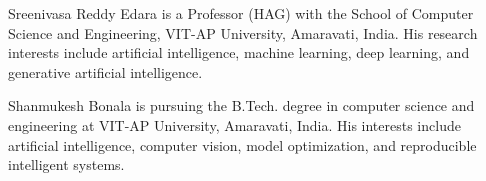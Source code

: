 \begin{IEEEbiographynophoto}{Sreenivasa Reddy Edara}
is a Professor (HAG) with the School of Computer Science and Engineering, VIT-AP University, Amaravati, India. His research interests include artificial intelligence, machine learning, deep learning, and generative artificial intelligence.
\end{IEEEbiographynophoto}
\begin{IEEEbiographynophoto}{Shanmukesh Bonala}
is pursuing the B.Tech. degree in computer science and engineering at VIT-AP University, Amaravati, India. His interests include artificial intelligence, computer vision, model optimization, and reproducible intelligent systems.
\end{IEEEbiographynophoto}
